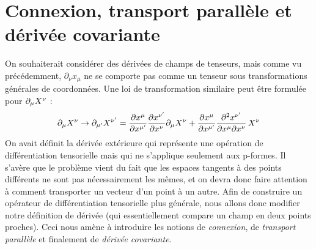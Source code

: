 \section{Connexion, transport parallèle et dérivée covariante}
On souhaiterait considérer des dérivées de champs de tenseurs, mais comme vu précédemment, $\partial_{\nu}x_{\mu}$ ne se comporte pas comme un tenseur sous transformations générales de coordonnées. Une loi de transformation similaire peut être formulée pour $\partial_\mu X^\nu$ :
\begin{equation}
    \partial_\mu X^\nu \to \partial_{\mu'} X^{\nu'} = \frac{\partial x^\mu}{\partial x^{\mu'}} \frac{\partial x^{\nu'}}{\partial x^{\nu}} \partial_\mu X^\nu + \frac{\partial x^\mu}{\partial x^{\mu'}} \frac{\partial^2 x^{\nu'}}{\partial x^{\mu}\partial x^{\nu}}\, X^\nu 
\end{equation}
On avait définit la dérivée extérieure qui représente une opération de différentiation tensorielle mais qui ne s'applique seulement aux p-formes. Il s'avère que le problème vient du fait que les espaces tangents à des points différents ne sont pas nécessairement les mêmes, et on devra donc faire attention à comment transporter un vecteur d'un point à un autre. Afin de construire un opérateur de différentiation tensorielle plus générale, nous allons donc modifier notre définition de dérivée (qui essentiellement compare un champ en deux points proches). Ceci nous amène à introduire les notions de \emph{connexion}, de \emph{transport parallèle} et finalement de \emph{dérivée covariante}.
\vspace{5pt}

